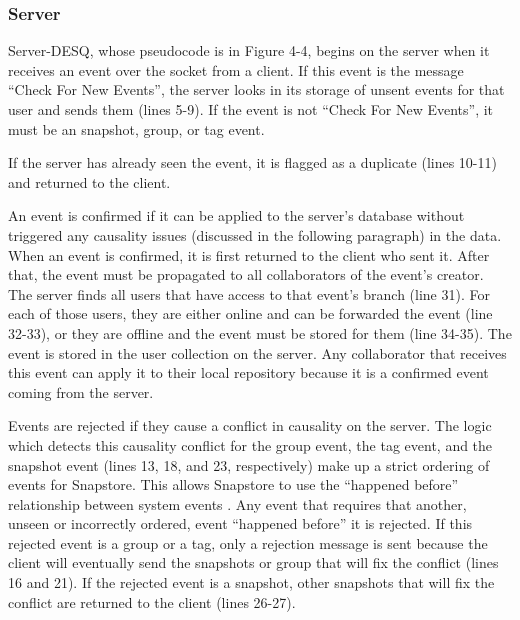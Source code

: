 \subsubsection{Server}

Server-DESQ, whose pseudocode is in Figure 4-4, begins on the server when it receives an event over the socket from a client. If this event is the message ``Check For New Events'', the server looks in its storage of unsent events for that user and sends them (lines 5-9). If the event is not ``Check For New Events'', it must be an snapshot, group, or tag event.

If the server has already seen the event, it is flagged as a duplicate (lines 10-11) and returned to the client. 

An event is confirmed if it can be applied to the server's database without triggered any causality issues (discussed in the following paragraph) in the data. When an event is confirmed, it is first returned to the client who sent it. After that, the event must be propagated to all collaborators of the event's creator. The server finds all users that have access to that event's branch (line 31). For each of those users, they are either online and can be forwarded the event (line 32-33), or they are offline and the event must be stored for them (line 34-35). The event is stored in the user collection on the server. Any collaborator that receives this event can apply it to their local repository because it is a confirmed event coming from the server.

Events are rejected if they cause a conflict in causality on the server. The logic which detects this causality conflict for the group event, the tag event, and the snapshot event (lines 13, 18, and 23, respectively) make up a strict ordering of events for Snapstore. This allows Snapstore to use the ``happened before'' relationship between system events \cite{Lamport}. Any event that requires that another, unseen or incorrectly ordered, event ``happened before'' it is rejected. If this rejected event is a group or a tag, only a rejection message is sent because the client will eventually send the snapshots or group that will fix the conflict (lines 16 and 21). If the rejected event is a snapshot, other snapshots that will fix the conflict are returned to the client (lines 26-27). 


